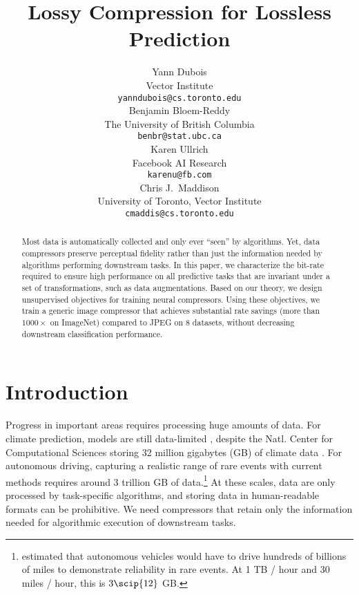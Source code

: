 \documentclass[final]{article}
\title{Lossy Compression for Lossless Prediction }
\author{Yann Dubois\\
  Vector Institute \\
  \texttt{yanndubois@cs.toronto.edu} \\
  \And  
  Benjamin Bloem-Reddy\\
  The University of British Columbia \\
  \texttt{benbr@stat.ubc.ca} \\
  \AND
  Karen Ullrich \\
  Facebook AI Research \\
  \texttt{karenu@fb.com} \\
  \And
  Chris J.~Maddison \\
  University of Toronto, Vector Institute \\
  \texttt{cmaddis@cs.toronto.edu} \\
}
\begin{document}
\doparttoc \faketableofcontents 

\maketitle

\begin{abstract}
Most data is automatically collected and only ever ``seen'' by algorithms.
Yet, data compressors preserve perceptual fidelity rather than just the information needed by algorithms performing downstream tasks.
In this paper, we characterize the bit-rate required to ensure high performance on all predictive tasks that are invariant under a set of transformations, such as data augmentations.
Based on our theory, we design unsupervised objectives for training neural compressors.
Using these objectives, we train a generic image compressor that achieves substantial rate savings (more than $1000\times$ on ImageNet) compared to JPEG on 8 datasets, without decreasing downstream classification performance.
\end{abstract}

 
\section{Introduction}
\label{sec:introduction}







Progress in important areas requires processing huge amounts of data. 
For climate prediction, models are still data-limited \cite{rolnick_tackling_2019}, despite the Natl. Center for Computational Sciences storing 32 million gigabytes (GB) of climate data \cite{zgurovsky_big_2020}. For autonomous driving, capturing a realistic range of rare events with current methods requires around 3 trillion GB of data.\footnote{\citet{kalra_driving_2016} estimated that autonomous vehicles would have to drive hundreds of billions of miles to demonstrate reliability in rare events. At 1 TB / hour \citep{yeong_sensor_2021} and 30 miles / hour, this is $3\scip{12}$ GB.}
At these scales, data are only processed by task-specific algorithms, and storing data in human-readable formats can be prohibitive.
We need compressors that retain only the information needed for algorithmic execution of downstream tasks.
\end{document}
